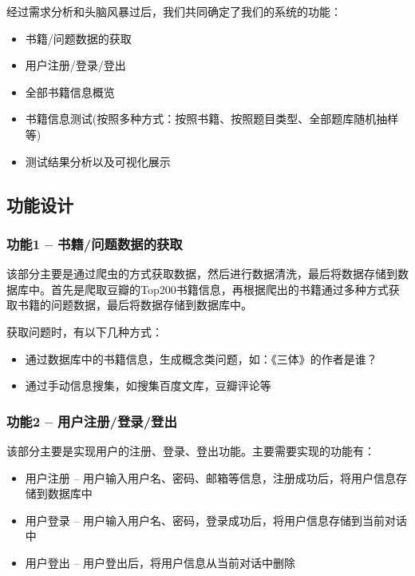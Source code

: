 \documentclass[twoside,11pt]{article}
\begin{document}
经过需求分析和头脑风暴过后，我们共同确定了我们的系统的功能：
\begin{itemize}
    \item 书籍/问题数据的获取
    \item 用户注册/登录/登出
    \item 全部书籍信息概览
    \item 书籍信息测试(按照多种方式：按照书籍、按照题目类型、全部题库随机抽样等)
    \item 测试结果分析以及可视化展示
\end{itemize}

\subsection{功能设计}

\subsubsection{功能1 -- 书籍/问题数据的获取}
该部分主要是通过爬虫的方式获取数据，然后进行数据清洗，最后将数据存储到数据库中。首先是爬取豆瓣的Top200书籍信息，再根据爬出的书籍通过多种方式获取书籍的问题数据，最后将数据存储到数据库中。

获取问题时，有以下几种方式：
\begin{itemize}
    \item 通过数据库中的书籍信息，生成概念类问题，如：《三体》的作者是谁？
    \item 通过手动信息搜集，如搜集百度文库，豆瓣评论等
\end{itemize}

\vspace{0.5cm}

\subsubsection{功能2 -- 用户注册/登录/登出}
该部分主要是实现用户的注册、登录、登出功能。主要需要实现的功能有：
\begin{itemize}
    \item 用户注册 -- 用户输入用户名、密码、邮箱等信息，注册成功后，将用户信息存储到数据库中
    \item 用户登录 -- 用户输入用户名、密码，登录成功后，将用户信息存储到当前对话中
    \item 用户登出 -- 用户登出后，将用户信息从当前对话中删除
\end{itemize}

\vspace{0.5cm}
\end{document}
